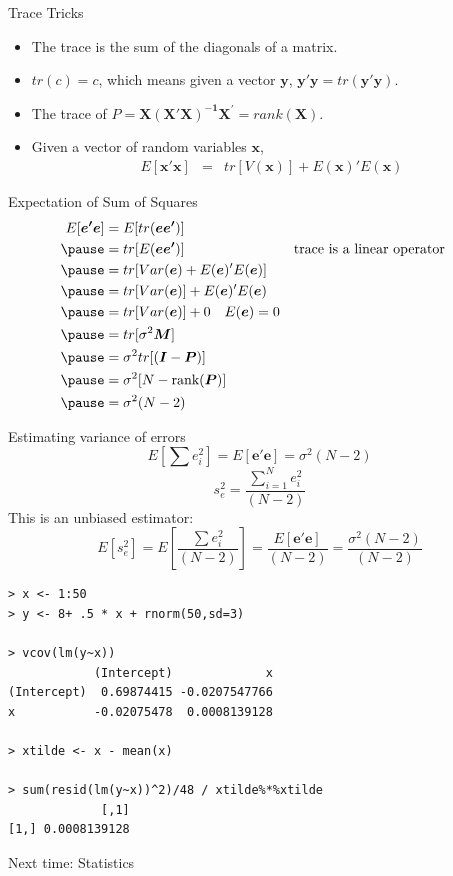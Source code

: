 \documentclass[aspectratio=169, handout]{beamer}
\numberwithin{equation}{section}
\begin{document}
\begin{frame}{Trace Tricks}
\begin{itemize}
\item The trace is the sum of the diagonals of a matrix.
\item $tr(c)=c$, which means given a vector $\bm{y}$, $\bm{y'}\bm{y}=tr(\bm{y'}\bm{y})$.
\item The trace of $P=\bm{X}\bm{(X'X)^{-1}}\bm{X^{'}}=rank(\bm{X})$.
\item Given a vector of random variables $\bm{x}$,
 \begin{eqnarray*}
E[\bm{x'x}]&=&tr[V(\bm{x})]+E(\bm{x})'E(\bm{x})
\end{eqnarray*}
\end{itemize}
\end{frame}

\begin{frame}{Expectation of Sum of Squares}
\begin{align*}
E[\bm{e'e}]&= E[tr(\bm{ee'})]\\ \pause
&=tr[E(\bm{ee'})] && \text{trace is a linear operator}\\\pause
&= tr[Var(\bm{e})+E(\bm{e})'E(\bm{e})]\\\pause
&=tr[Var(\bm{e})]+E(\bm{e})'E(\bm{e})\\\pause
&=tr[Var(\bm{e})]+0\quad E(\bm{e})=0\\\pause
&=tr[\sigma^2 \bm{M}]\\\pause
&=\sigma^2 tr[(\bm{I}-\bm{P})]\\\pause
&=\sigma^2 [N-\text{rank}(\bm{P})]\\\pause
&=\sigma^2 (N-2)
\end{align*}
\end{frame}


\begin{frame}{Estimating variance of errors}
$$E[\sum e_i^2]=E[\bm{e'e}]=\sigma^2 (N-2)$$
$$s^2_e=\frac{\sum_{i=1}^N e_i^2}{(N-2)}$$
This is an unbiased estimator:
$$E[s^2_e]=E[\frac{\sum e_i^2}{(N-2)}]=\frac{E[\bm{e'e}]}{(N-2)}=\frac{\sigma^2 (N-2)}{(N-2)}$$
\end{frame}


\begin{frame}[fragile]
  \begin{lstlisting}
> x <- 1:50
> y <- 8+ .5 * x + rnorm(50,sd=3)
 
> vcov(lm(y~x))
            (Intercept)             x
(Intercept)  0.69874415 -0.0207547766
x           -0.02075478  0.0008139128
 
> xtilde <- x - mean(x)

> sum(resid(lm(y~x))^2)/48 / xtilde%*%xtilde
             [,1]
[1,] 0.0008139128
   \end{lstlisting}
\end{frame}



\begin{frame}{Next time: Statistics}

\end{frame}
\end{document}
